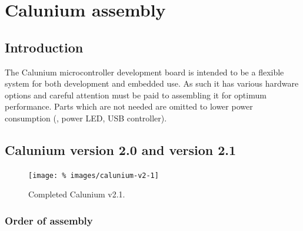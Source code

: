 \chapter{Calunium assembly}

\section{Introduction}

The Calunium microcontroller development board is intended to be a
flexible system for both development and embedded use. As such it has
various hardware options and careful attention must be paid to
assembling it for optimum performance. Parts which are not needed are
omitted to lower power consumption (\eg, power LED, USB controller).

\section{Calunium version 2.0 and version 2.1}

\begin{figure}
  \centering
  \texttt{[image: \%
    images/calunium-v2-1]}
  \caption[Completed Calunium v2.1]{%
    Completed Calunium v2.1. }
  \label{fig:calunium-version-2.1}
\end{figure}

\subsection{Order of assembly}

